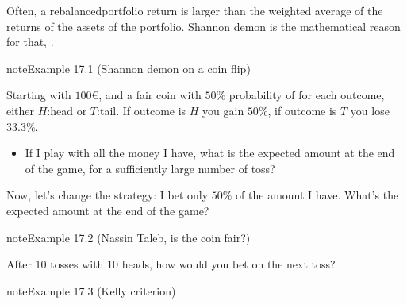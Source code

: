 \documentclass[letterpaper,10pt,english]{jupyterBook}
\begin{document}
\sphinxAtStartPar
Often, a rebalanced\sphinxhyphen{}portfolio return is larger than the weighted average of the returns of the assets of the portfolio. Shannon demon is the mathematical reason for that, .
\label{ch/investing/rebalancing:example-0}
\begin{sphinxadmonition}{note}{Example 17.1 (Shannon demon \sphinxhyphen{} on a coin flip)}



\sphinxAtStartPar
Starting with \(100\)€, and a fair coin with \(50\%\) probability of for each outcome, either \(H\):head or \(T\):tail. If outcome is \(H\) you gain \(50 \%\), if outcome is \(T\) you lose \(33.3 \%\).
\begin{itemize}
\item {} 
\sphinxAtStartPar
If I play with all the money I have, what is the expected amount at the end of the game, for a sufficiently large number of toss?

\end{itemize}

\sphinxAtStartPar
Now, let’s change the strategy: I bet only \(50 \%\) of the amount I have. What’s the expected amount at the end of the game?
\end{sphinxadmonition}
\label{ch/investing/rebalancing:example-1}
\begin{sphinxadmonition}{note}{Example 17.2 (Nassin Taleb, is the coin fair?)}



\sphinxAtStartPar
After 10 tosses with 10 heads, how would you bet on the next toss?
\end{sphinxadmonition}
\label{ch/investing/rebalancing:example-2}
\begin{sphinxadmonition}{note}{Example 17.3 (Kelly criterion)}


\end{sphinxadmonition}
\label{ch/investing/rebalancing:example-3}
\end{document}
